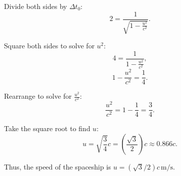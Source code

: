 \documentclass[a4paper,12pt]{article}
\begin{document}
\begin{multicols}{2}
Divide both sides by \( \Delta t_0 \):
\[
2 = \frac{1}{\sqrt{1 - \frac{u^2}{c^2}}}.
\]

Square both sides to solve for \( u^2 \):
\[
4 = \frac{1}{1 - \frac{u^2}{c^2}},
\]
\[
1 - \frac{u^2}{c^2} = \frac{1}{4}.
\]

Rearrange to solve for \( \frac{u^2}{c^2} \):
\[
\frac{u^2}{c^2} = 1 - \frac{1}{4} = \frac{3}{4}. \tag{L5}
\]

Take the square root to find \( u \):
\[
u = \sqrt{\frac{3}{4}} c = \left( \frac{\sqrt{3}}{2} \right) c \approx 0.866c.
\]

Thus, the speed of the spaceship is \( u = (\sqrt{3}/2) c \, \text{m/s} \).

\end{multicols}
\end{document}
